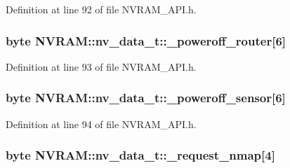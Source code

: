 Definition at line 92 of file N\-V\-R\-A\-M\-\_\-\-A\-P\-I.\-h.

\hypertarget{struct_n_v_r_a_m_1_1nv__data__t_a9eb1ca08d7fb842e408a1a0d09689bb9}{
\subsubsection[{\-\_\-poweroff\-\_\-router}]{\setlength{\rightskip}{0pt plus 5cm}byte N\-V\-R\-A\-M\-::nv\-\_\-data\-\_\-t\-::\-\_\-poweroff\-\_\-router\mbox{[}6\mbox{]}}}\label{struct_n_v_r_a_m_1_1nv__data__t_a9eb1ca08d7fb842e408a1a0d09689bb9}


Definition at line 93 of file N\-V\-R\-A\-M\-\_\-\-A\-P\-I.\-h.

\hypertarget{struct_n_v_r_a_m_1_1nv__data__t_a2bb36a9095d5385c0d0b83a38961a2f4}{
\subsubsection[{\-\_\-poweroff\-\_\-sensor}]{\setlength{\rightskip}{0pt plus 5cm}byte N\-V\-R\-A\-M\-::nv\-\_\-data\-\_\-t\-::\-\_\-poweroff\-\_\-sensor\mbox{[}6\mbox{]}}}\label{struct_n_v_r_a_m_1_1nv__data__t_a2bb36a9095d5385c0d0b83a38961a2f4}


Definition at line 94 of file N\-V\-R\-A\-M\-\_\-\-A\-P\-I.\-h.

\hypertarget{struct_n_v_r_a_m_1_1nv__data__t_acf47580a8e3b89cdd98ca35c36ae66d3}{
\subsubsection[{\-\_\-request\-\_\-nmap}]{\setlength{\rightskip}{0pt plus 5cm}byte N\-V\-R\-A\-M\-::nv\-\_\-data\-\_\-t\-::\-\_\-request\-\_\-nmap\mbox{[}4\mbox{]}}}\label{struct_n_v_r_a_m_1_1nv__data__t_acf47580a8e3b89cdd98ca35c36ae66d3}


